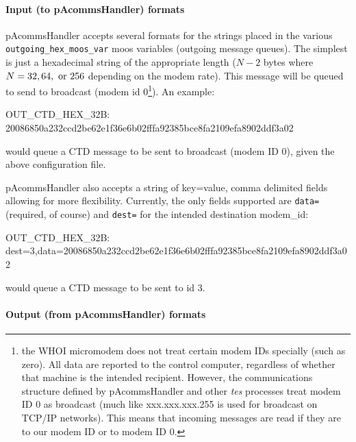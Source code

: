 \documentclass[11pt, letterpaper, oneside]{memoir}
\begin{document}
\paragraph{Input (to pAcommsHandler) formats}\label{inputformat}

pAcommsHandler accepts several formats for the strings placed in the
various \verb|outgoing_hex_moos_var| moos variables (outgoing message queues). The
simplest is just a hexadecimal string of the appropriate length ($N-2$
bytes where $N=32, 64, \hbox{ or } 256$ depending on the modem
rate). This message will be queued to send to broadcast (modem id
0\footnote{the WHOI micromodem does not treat certain modem IDs
  specially (such as zero). All data are reported to the control
  computer, regardless of whether that machine is the intended
  recipient. However, the communications structure defined by
  pAcommsHandler and other \textit{tes} processes treat modem ID 0 as
  broadcast (much like xxx.xxx.xxx.255 is used for broadcast on TCP/IP
  networks). This means that incoming messages are read if they are to
  our modem ID or to modem ID 0.}). An example:
\begin{boxedverbatim}
OUT_CTD_HEX_32B: 20086850a232ccd2be62e1f36e6b02fffa92385bce8fa2109efa8902ddf3a02
\end{boxedverbatim}
\resetbvlinenumber
would queue a CTD message to be sent to broadcast (modem ID 0), given the above configuration file.

pAcommsHandler also accepts a string of key=value, comma delimited
fields allowing for more flexibility. Currently, the only fields
supported are \verb|data=| (required, of course) and \verb|dest=|
for the intended destination modem\_id:
\begin{boxedverbatim}
OUT_CTD_HEX_32B: dest=3,data=20086850a232ccd2be62e1f36e6b02fffa92385bce8fa2109efa8902ddf3a02
\end{boxedverbatim}
\resetbvlinenumber
would queue a CTD message to be sent to id 3.


\paragraph{Output (from pAcommsHandler) formats} 
\end{document}
